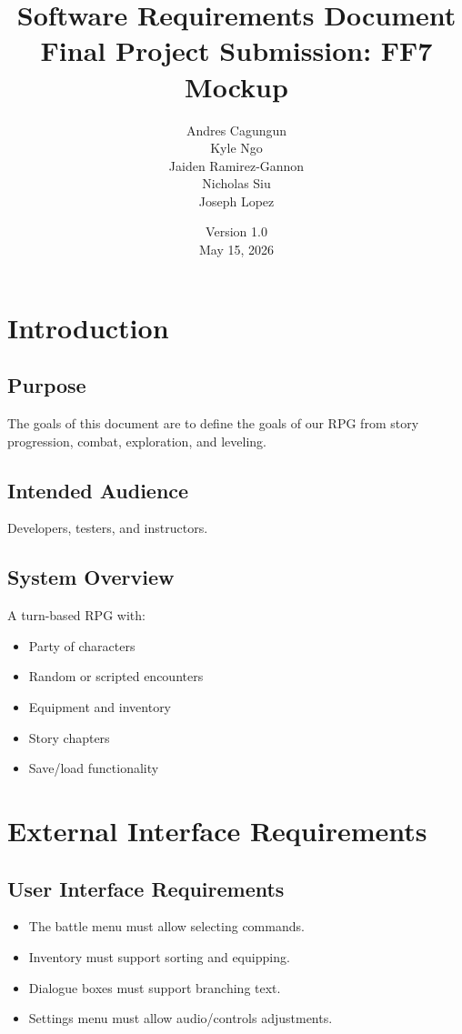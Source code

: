 \documentclass[12pt]{article}
\title{Software Requirements Document \\ \large Final Project Submission: FF7 Mockup}
\author{Andres Cagungun \\ Kyle Ngo \\ Jaiden Ramirez-Gannon \\ Nicholas Siu \\ Joseph Lopez}
\date{Version 1.0 \\ May 15, 2026}
\begin{document}
\maketitle
\tableofcontents
\newpage

\section{Introduction}

\subsection{Purpose}
The goals of this document are to define the goals of our RPG from story progression, combat, exploration, and leveling.

\subsection{Intended Audience}
Developers, testers, and instructors.

\subsection{System Overview}
A turn-based RPG with:
\begin{itemize}
    \item Party of characters
    \item Random or scripted encounters
    \item Equipment and inventory
    \item Story chapters
    \item Save/load functionality
\end{itemize}

\section{External Interface Requirements}

\subsection{User Interface Requirements}
\begin{itemize}
    \item The battle menu must allow selecting commands.
    \item Inventory must support sorting and equipping.
    \item Dialogue boxes must support branching text.
    \item Settings menu must allow audio/controls adjustments.
\end{itemize}
\end{document}
